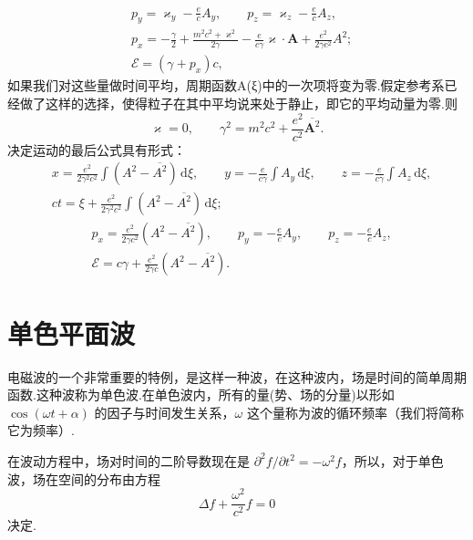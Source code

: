 \begin{xiti}
\begin{equation*}
\begin{aligned}
  &p_y=\varkappa_y-\frac{e}{c}A_y,\qquad
  p_z=\varkappa_z-\frac{e}{c}A_z,\\
  &p_x=-\frac{\gamma}{2}+\frac{m^2c^2+\varkappa^2}{2\gamma}
  -\frac{e}{c\gamma}\boldsymbol{\varkappa}\cdot\boldsymbol{A}
  +\frac{e^2}{2\gamma c^2}A^2;\\
  &\mathcal{E}=(\gamma+p_x)c,
\end{aligned}
\end{equation*}
如果我们对这些量做时间平均，周期函数A(ξ)中的一次项将变为零.假定参考系已经做了这样的选择，使得粒子在其中平均说来处于静止，即它的平均动量为零.则
\begin{equation*}
  \varkappa=0,\qquad
  \gamma^2=m^2c^2+\frac{e^2}{c^2}\overline{\boldsymbol{A}^2}.
\end{equation*}
决定运动的最后公式具有形式：
\begin{equation}\tag{3}
\begin{aligned}
  &x=\frac{e^2}{2\gamma^2c^2}\int(A^2-\overline{A^2})\,\mathrm{d}\xi,\qquad
  y=-\frac{e}{c\gamma}\int A_y\,\mathrm{d}\xi,\qquad
  z=-\frac{e}{c\gamma}\int A_z\,\mathrm{d}\xi,\\
  &ct=\xi+\frac{e^2}{2\gamma^2c^2}\int(A^2-\overline{A^2})\,\mathrm{d}\xi;
\end{aligned}
\end{equation}
\begin{equation}\tag{4}
\begin{aligned}
  &p_x=\frac{e^2}{2\gamma c^2}(A^2-\overline{A^2}),\qquad
  p_y=-\frac{e}{c}A_y,\qquad
  p_z=-\frac{e}{c}A_z,\\
  &\mathcal{E}=c\gamma+\frac{e^2}{2\gamma c}(A^2-\overline{A^2}).
\end{aligned}
\end{equation}

\end{xiti}

\section{单色平面波}

电磁波的一个非常重要的特例，是这样一种波，在这种波内，场是时间的简单周期函数.这种波称为单色波.在单色波内，所有的量(势、场的分量)以形如 $\cos(\omega t + \alpha)$ 的因子与时间发生关系，$\omega$ 这个量称为波的循环频率（我们将简称它为频率）.

在波动方程中，场对时间的二阶导数现在是 $\partial^2 f/\partial t^2 = -\omega^2 f$，所以，对于单色波，场在空间的分布由方程
\begin{equation}
  \Delta f+\frac{\omega^2}{c^2}f=0
\end{equation}
决定.


